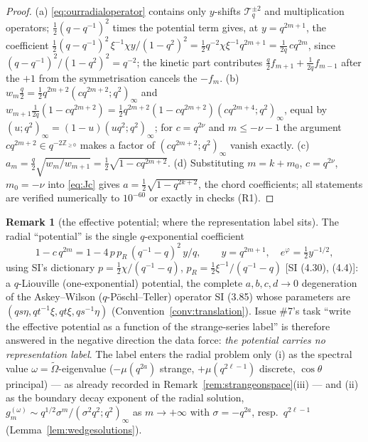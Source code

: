 \documentclass[11pt,a4paper]{article}
\theoremstyle{definition}
\newtheorem{remark}[definition]{Remark}
\theoremstyle{plain}
\newcommand{\tCas}{\tilde\Omega}                %
\newcommand{\Z}{\mathbb{Z}}
\begin{document}
\begin{proof}
(a) \eqref{eq:ourradialoperator} contains only $y$-shifts $\mathcal{T}_{q}^{\pm2}$ and
multiplication operators; $\tfrac12(q-q^{-1})^{2}$ times the potential term gives, at
$y=q^{2m+1}$, the coefficient $\tfrac12(q-q^{-1})^{2}\,\xi^{-1}\chi y/(1-q^{2})^{2}
=\tfrac12 q^{-2}\chi\xi^{-1}q^{2m+1}=\tfrac{1}{2q}\,cq^{2m}$, since
$(q-q^{-1})^{2}/(1-q^{2})^{2}=q^{-2}$; the kinetic part contributes
$\tfrac{q}{2}f_{m+1}+\tfrac{1}{2q}f_{m-1}$ after the $+1$ from the symmetrisation cancels the
$-f_m$. (b) $w_{m}\tfrac q2=\tfrac12 q^{2m+2}(cq^{2m+2};q^{2})_{\infty}$ and
$w_{m+1}\tfrac{1}{2q}(1-cq^{2m+2})=\tfrac12 q^{2m+2}(1-cq^{2m+2})(cq^{2m+4};q^{2})_{\infty}$,
equal by $(u;q^{2})_{\infty}=(1-u)(uq^{2};q^{2})_{\infty}$; for $c=q^{2\nu}$ and $m\le-\nu-1$
the argument $cq^{2m+2}\in q^{-2\Z_{\ge0}}$ makes a factor of $(cq^{2m+2};q^{2})_{\infty}$
vanish exactly. (c) $a_{m}=\tfrac q2\sqrt{w_{m}/w_{m+1}}=\tfrac12\sqrt{1-cq^{2m+2}}$.
(d) Substituting $m=k+m_0$, $c=q^{2\nu}$, $m_0=-\nu$ into \eqref{eq:Jc} gives
$a=\tfrac12\sqrt{1-q^{2k+2}}$, the chord coefficients; all statements are verified
numerically to $10^{-60}$ or exactly in checks (R1).
\end{proof}

\begin{remark}[the effective potential; where the representation label sits]
\label{rem:effectivepotential}
The radial ``potential'' is the single $q$-exponential coefficient
\begin{equation}\label{eq:qpotential}
  1-c\,q^{2m}=1-4\,p\,p_{R}\,(q^{-1}-q)^{2}\,y/q,\qquad y=q^{2m+1},\quad
  e^{\varphi}=\tfrac12 y^{-1/2},
\end{equation}
using SI's dictionary $p=\tfrac12\chi/(q^{-1}-q)$, $p_{R}=\tfrac12\xi^{-1}/(q^{-1}-q)$
[SI (4.30), (4.4)]: a $q$-Liouville (one-exponential) potential, the complete
$a,b,c,d\to0$ degeneration of the Askey--Wilson ($q$-P\"oschl--Teller) operator
SI (3.85) whose parameters are $(qs\eta,qt^{-1}\xi,qt\xi,qs^{-1}\eta)$
(Convention~\ref{conv:translation}). Issue \#7's task ``write the effective potential as a
function of the strange-series label'' is therefore answered in the negative direction the
data force: \emph{the potential carries no representation label}. The label enters the radial
problem only (i) as the spectral value $\omega=\tCas$-eigenvalue ($-\mu(q^{2a})$ strange,
$+\mu(q^{2\ell-1})$ discrete, $\cos\theta$ principal) --- as already recorded in
Remark~\ref{rem:strangeonspace}(iii) --- and (ii) as the boundary decay exponent of the
radial solution, $g^{(\omega)}_{m}\sim q^{1/2}\sigma^{m}/(\sigma^{2}q^{2};q^{2})_{\infty}$
as $m\to+\infty$ with $\sigma=-q^{2a}$, resp.\ $q^{2\ell-1}$
(Lemma~\ref{lem:wedgesolutions}).
\end{remark}
\end{document}
